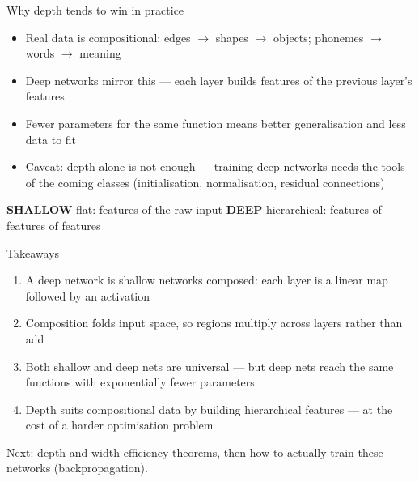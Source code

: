 \documentclass[aspectratio=169, 11pt]{beamer}
\newcommand{\shpar}[2]{%
  \vfill
  {\footnotesize
  \begin{tcolorbox}[enhanced, sidebyside, sidebyside align=top,
                    lefthand ratio=0.485,
                    segmentation style={shc!35, line width=0.6pt},
                    colback=shc!5, colframe=shc!35, boxrule=0.5pt,
                    arc=1.5mm, left=2mm, right=2mm, top=0.8mm, bottom=0.8mm]
    {\color{shc}\textbf{SHALLOW}}\;\; #1
  \tcblower
    {\color{dpc}\textbf{DEEP}}\;\; #2
  \end{tcolorbox}}%
  \vspace{0.6em}%
}
\newcommand{\src}[3]{}      %
\newcommand{\nosrc}{}       %
\begin{document}
\begin{frame}{Why depth tends to win in practice}
  \src{prince2023}{section}{4.5.5}
  \src{bishop2024}{section}{6.3.1}
  \begin{itemize}
    \item Real data is \alert{compositional}: edges $\to$
          shapes $\to$ objects; phonemes $\to$ words $\to$
          meaning
    \item Deep networks mirror this --- each layer builds
          \alert{features of the previous layer's features}
    \item Fewer parameters for the same function means
          \alert{better generalisation} and less data to fit
    \item Caveat: depth alone is not enough --- training deep
          networks needs the tools of the coming classes
          (initialisation, normalisation, residual
          connections)
  \end{itemize}
  \shpar{flat: features of the raw input}
        {hierarchical: features of features of features}
\end{frame}

\begin{frame}{Takeaways}
  \nosrc
  \begin{enumerate}\setlength{\itemsep}{2pt}
    \item A \alert{deep network} is shallow networks
          \alert{composed}: each layer is a linear map
          followed by an activation
    \item Composition \alert{folds} input space, so regions
          \alert{multiply} across layers rather than add
    \item Both shallow and deep nets are universal ---
          but deep nets reach the same functions with
          \alert{exponentially fewer parameters}
    \item Depth suits \alert{compositional} data by building
          hierarchical features --- at the cost of a harder
          optimisation problem
  \end{enumerate}
  \vspace{0.3em}
  \begin{redhighlight}
    Next: depth and width efficiency theorems, then how to
    actually \alert{train} these networks (backpropagation).
  \end{redhighlight}
\end{frame}
\end{document}
